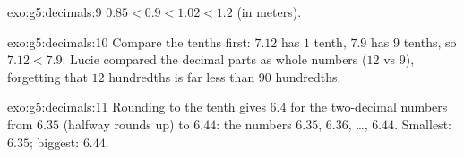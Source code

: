 \begin{solution}{exo:g5:decimals:9}
$0.85 < 0.9 < 1.02 < 1.2$ (in meters).
\end{solution}

\begin{solution}{exo:g5:decimals:10}
Compare the tenths first: $7.12$ has $1$ tenth, $7.9$ has $9$
tenths, so $7.12 < 7.9$. Lucie compared the decimal parts as whole
numbers ($12$ vs $9$), forgetting that $12$ hundredths is far less
than $90$ hundredths.
\end{solution}

\begin{solution}{exo:g5:decimals:11}
Rounding to the tenth gives $6.4$ for the two-decimal numbers from
$6.35$ (halfway rounds up) to $6.44$: the numbers $6.35$, $6.36$,
\dots, $6.44$. Smallest: $6.35$; biggest: $6.44$.
\end{solution}
